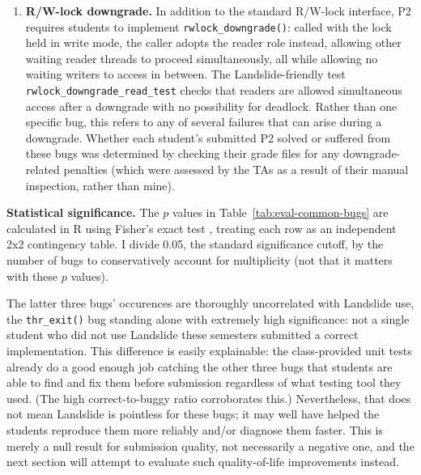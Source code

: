 \begin{enumerate}
\item
{\bf R/W-lock downgrade.}
In addition to the standard R/W-lock interface,
P2 requires students to implement {\tt rwlock\_downgrade()}:
called with the lock held in write mode,
the caller adopts the reader role instead,
allowing other waiting reader threads to proceed simultaneously,
all while allowing no waiting writers to access in between.
%
The Landslide-friendly test {\tt rwlock\_downgrade\_read\_test}
checks that readers are allowed simultaneous access after a downgrade with no possibility for deadlock.
Rather than one specific bug, this refers to any of several failures that can arise during a downgrade.
Whether each student's submitted P2 solved or suffered from these bugs
was determined by checking their grade files for any downgrade-related penalties
(which were assessed by the TAs as a result of their manual inspection, rather than mine).
\end{enumerate}

{\bf Statistical significance.}
The $p$ values
in Table~\ref{tab:eval-common-bugs}
are calculated in R \cite{r-lang} using Fisher's exact test \cite{fishers-exact-test},
treating each row as an independent 2x2 contingency table.
I divide 0.05, the standard significance cutoff,
by the number of bugs to conservatively account for multiplicity \cite{xkcd-jellybeans}
(not that it matters with these $p$ values).

The latter three bugs' occurences are thoroughly uncorrelated with Landslide use,
the {\tt thr\_exit()} bug standing alone with extremely high significance:
not a single student who did not use Landslide these semesters
submitted a correct implementation.
This difference is easily explainable:
the class-provided unit tests already do a good enough job catching the other three bugs
that students are able to find and fix them before submission regardless of what testing tool they used.
(The high correct-to-buggy ratio corroborates this.)
Nevertheless, that does not mean Landslide is pointless for these bugs;
it may well have helped the students reproduce them more reliably and/or diagnose them faster.
This is merely a null result for submission quality, not necessarily a negative one,
and the next section will attempt to evaluate such quality-of-life improvements instead.

